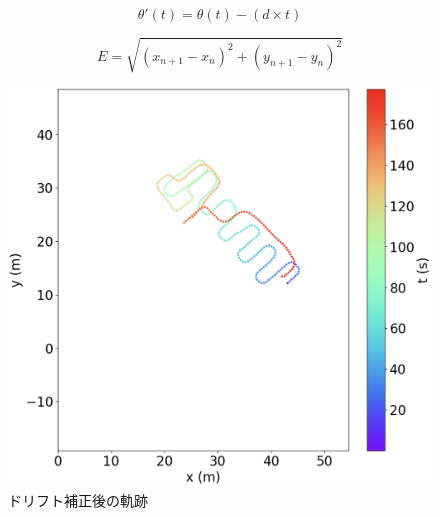 \begin{equation}
    \theta'(t) = \theta(t) - (d \times t)
    \label{eq:drift_correction}
\end{equation}


\begin{equation}
    E = \sqrt{(x_{n+1} - x_n)^2 + (y_{n+1} - y_n)^2}
    \label{eq:euclidean_distance}
\end{equation}


\begin{figure}[H]
	\centering
	\includegraphics[width=\linewidth]{../image/pdr-remove-drift-two.jpg}
	\caption{ドリフト補正後の軌跡}    \label{fig:pdr-remove-drift}
\end{figure}

